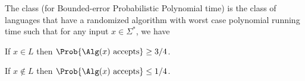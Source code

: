 \begin{defn}
        The class  (for Bounded-error Probabilistic Polynomial
        time) is the class of languages that have a randomized algorithm
        \Alg with worst case polynomial running time such that for any
        input $x \in \Sigma^*$, we have
        \begin{compactenumi}
            \item If $x \in L$ then $\Prob{\Alg(x) \text{ accepts}}
            \geq 3/4$.
     
            \item If $x \notin L$ then $\Prob{\Alg(x) \text{ accepts}}
            \leq 1/4$.
        \end{compactenumi}    
    \end{defn}
